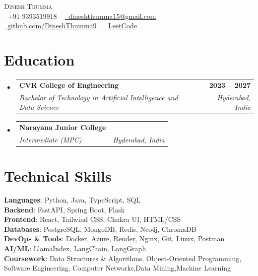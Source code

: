 \documentclass[letterpaper,11pt]{article}
\makeatletter
\newcommand{\resumeSubheading}[4]{
  \vspace{-2pt}\item
    \begin{tabular*}{1.0\textwidth}[t]{l@{\extracolsep{\fill}}r}
      \textbf{#1} & \textbf{\small #2} \\
      \textit{\small#3} & \textit{\small #4} \\
    \end{tabular*}\vspace{-7pt}
}
\newcommand{\resumeSubHeadingListStart}{\begin{itemize}[leftmargin=0.0in, label={}]}
\newcommand{\resumeSubHeadingListEnd}{\end{itemize}}
\makeatother
\begin{document}
\begin{center}
    {\Huge \scshape Dinesh Thumma} \\ \vspace{1pt}
    \small \raisebox{-0.1\height}\faPhone\ +91 9393519918 ~
    \href{mailto:dineshthumma15@gmail.com}{\raisebox{-0.2\height}\faEnvelope\ \underline{dineshthumma15@gmail.com}} ~
    \href{https://github.com/DineshThumma9}{\raisebox{-0.2\height}\faGithub\ \underline{github.com/DineshThumma9}} ~
    \href{https://leetcode.com/u/dineshthummax975/}{\raisebox{-0.2\height}\faCode\ \underline{LeetCode }}
    \vspace{-8pt}
\end{center}

\section{Education}
  \resumeSubHeadingListStart
    \resumeSubheading
      {CVR College of Engineering}{2023 -- 2027}
      {Bachelor of Technology in Artificial Intelligence and Data Science}{Hyderabad, India}
    \resumeSubheading
      {Narayana Junior College}{}
      {Intermediate (MPC)}{Hyderabad, India}
  \resumeSubHeadingListEnd

\section{Technical Skills}
 \begin{itemize}[leftmargin=0.15in, label={}]
    \small{\item{
     \textbf{Languages}{: Python, Java, TypeScript, SQL} \\
     \textbf{Backend}{: FastAPI, Spring Boot, Flask} \\
     \textbf{Frontend}{: React, Tailwind CSS, Chakra UI, HTML/CSS} \\
     \textbf{Databases}{: PostgreSQL, MongoDB, Redis, Neo4j, ChromaDB} \\
     \textbf{DevOps \& Tools}{: Docker, Azure, Render, Nginx, Git, Linux, Postman} \\
     \textbf{AI/ML}{: LlamaIndex, LangChain, LangGraph} \\
     \textbf{Coursework}{: Data Structures \& Algorithms, Object-Oriented Programming, Software Engineering, Computer Networks,Data Mining,Machine Learning} \\

 }}
 \end{itemize}
 \vspace{-16pt}
\end{document}

